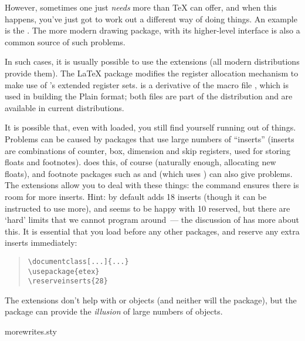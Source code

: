 However, sometimes one just \emph{needs} more than \TeX{} can offer,
and when this happens, you've just got to work out a different way of
doing things.  An example is the %
.
The more modern drawing package,  with its higher-level
interface  is also a common source of such problems.

In such cases, it is usually possible to use the
 extensions (all modern distributions provide
them).  The \LaTeX{} package  modifies the register allocation
mechanism to make use of \eTeX{}'s extended register sets.
 is a
derivative of the \plaintex{} macro file , which is
used in building the \eTeX{} Plain format; both files are part of the
\eTeX{} distribution and are available in current distributions.

It is possible that, even with  loaded, you still find
yourself running out of things.  Problems can be caused by packages
that use large numbers of ``inserts'' (inserts are combinations of
counter, box, dimension and skip registers, used for storing floats
and footnotes).   does this, of course (naturally enough,
allocating new floats), and footnote packages such as
 and  (which uses )
can also give problems.  The  extensions allow you to deal with
these things: the command  ensures there
is room for  more inserts.  Hint: by default
 adds 18 inserts (though it can be instructed to
use more), and  seems to be happy with 10 reserved,
but there are `hard' limits that we cannot program around~--- the
discussion of  has more about this.
It is essential that you load  before any other
packages, and reserve any extra inserts immediately:
\begin{quote}
\begin{verbatim}
\documentclass[...]{...}
\usepackage{etex}
\reserveinserts{28}
\end{verbatim}
\end{quote}

The \eTeX{} extensions don't help with  or 
objects (and neither will the  package), but the
 package can provide the \emph{illusion} of large
numbers of  objects.
\begin{ctanrefs}
\item[morewrites.sty]
\end{ctanrefs}


